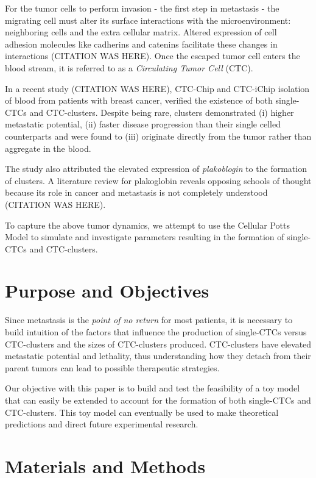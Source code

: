 \documentclass[12pt]{article}
\begin{document}
For the tumor cells to perform invasion - the first step in metastasis - the migrating cell must alter its surface interactions with the microenvironment: neighboring cells and the extra cellular matrix. Altered expression of cell adhesion molecules like cadherins and catenins facilitate these changes in interactions (CITATION WAS HERE). Once the escaped tumor cell enters the blood stream, it is referred to as a \emph{Circulating Tumor Cell} (CTC).

In a recent study (CITATION WAS HERE), CTC-Chip and CTC-iChip isolation of blood from patients with breast cancer, verified the existence of both single-CTCs and CTC-clusters. Despite being rare,  clusters demonstrated (i) higher metastatic potential, (ii) faster disease progression than their single celled counterparts and were found to (iii) originate directly from the tumor rather than aggregate in the blood.

The study also attributed the elevated expression of \emph{plakoblogin} to the formation of clusters. A literature review for plakoglobin reveals opposing schools of thought because its role in cancer and metastasis is not completely understood (CITATION WAS HERE).

To capture the above tumor dynamics, we attempt to use the Cellular Potts Model to simulate and investigate parameters resulting in the formation of single-CTCs and CTC-clusters.

\section{Purpose and Objectives}
Since metastasis is the \emph{point of no return} for most patients, it is necessary to build intuition of the factors that influence the production of single-CTCs versus CTC-clusters and the sizes of CTC-clusters produced. CTC-clusters have elevated metastatic potential and lethality, thus understanding how they detach from their parent tumors can lead to possible therapeutic strategies.

Our objective with this paper is to build and test the feasibility of a toy model that can easily be extended to account for the formation of both single-CTCs and CTC-clusters. This toy model can eventually be used to make theoretical predictions and direct future experimental research.

\section{Materials and Methods}
\end{document}
